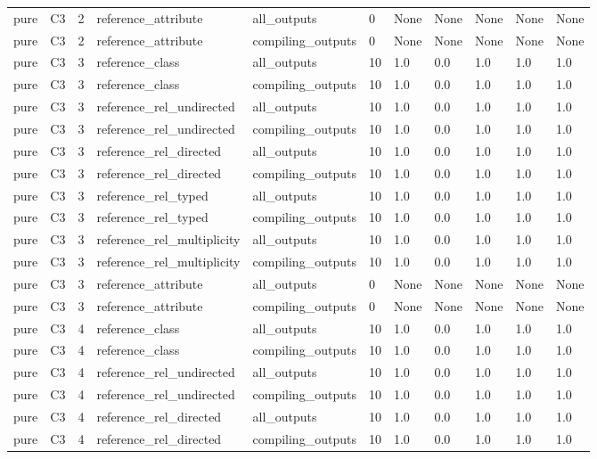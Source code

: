 \begin{tabular}{lllllllllll}
pure & C3 & 2 & reference\_attribute & all\_outputs & 0 & None & None & None & None & None \\
pure & C3 & 2 & reference\_attribute & compiling\_outputs & 0 & None & None & None & None & None \\
pure & C3 & 3 & reference\_class & all\_outputs & 10 & 1.0 & 0.0 & 1.0 & 1.0 & 1.0 \\
pure & C3 & 3 & reference\_class & compiling\_outputs & 10 & 1.0 & 0.0 & 1.0 & 1.0 & 1.0 \\
pure & C3 & 3 & reference\_rel\_undirected & all\_outputs & 10 & 1.0 & 0.0 & 1.0 & 1.0 & 1.0 \\
pure & C3 & 3 & reference\_rel\_undirected & compiling\_outputs & 10 & 1.0 & 0.0 & 1.0 & 1.0 & 1.0 \\
pure & C3 & 3 & reference\_rel\_directed & all\_outputs & 10 & 1.0 & 0.0 & 1.0 & 1.0 & 1.0 \\
pure & C3 & 3 & reference\_rel\_directed & compiling\_outputs & 10 & 1.0 & 0.0 & 1.0 & 1.0 & 1.0 \\
pure & C3 & 3 & reference\_rel\_typed & all\_outputs & 10 & 1.0 & 0.0 & 1.0 & 1.0 & 1.0 \\
pure & C3 & 3 & reference\_rel\_typed & compiling\_outputs & 10 & 1.0 & 0.0 & 1.0 & 1.0 & 1.0 \\
pure & C3 & 3 & reference\_rel\_multiplicity & all\_outputs & 10 & 1.0 & 0.0 & 1.0 & 1.0 & 1.0 \\
pure & C3 & 3 & reference\_rel\_multiplicity & compiling\_outputs & 10 & 1.0 & 0.0 & 1.0 & 1.0 & 1.0 \\
pure & C3 & 3 & reference\_attribute & all\_outputs & 0 & None & None & None & None & None \\
pure & C3 & 3 & reference\_attribute & compiling\_outputs & 0 & None & None & None & None & None \\
pure & C3 & 4 & reference\_class & all\_outputs & 10 & 1.0 & 0.0 & 1.0 & 1.0 & 1.0 \\
pure & C3 & 4 & reference\_class & compiling\_outputs & 10 & 1.0 & 0.0 & 1.0 & 1.0 & 1.0 \\
pure & C3 & 4 & reference\_rel\_undirected & all\_outputs & 10 & 1.0 & 0.0 & 1.0 & 1.0 & 1.0 \\
pure & C3 & 4 & reference\_rel\_undirected & compiling\_outputs & 10 & 1.0 & 0.0 & 1.0 & 1.0 & 1.0 \\
pure & C3 & 4 & reference\_rel\_directed & all\_outputs & 10 & 1.0 & 0.0 & 1.0 & 1.0 & 1.0 \\
pure & C3 & 4 & reference\_rel\_directed & compiling\_outputs & 10 & 1.0 & 0.0 & 1.0 & 1.0 & 1.0 \\

\end{tabular}
